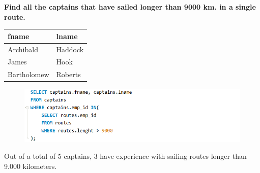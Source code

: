 \documentclass[a4paper]{article}
\begin{document}
\begin{flushleft}
    \textbf{Find all the captains that have sailed longer than 9000 km. in a single route.}
    \begin{table}[!ht]
    \flushleft
    \begin{tabular}{|l|l|}
    \hline
        fname & lname \\ \hline
        Archibald & Haddock \\ \hline
        James & Hook \\ \hline
        Bartholomew & Roberts \\ \hline
    \end{tabular}
    \end{table}
    \begin{figure} [H]
        \flushleft
        \includegraphics[width=1\linewidth]{code/SQLcaptainsLenght.PNG}
        \label{fig:SQLcaptainsLenght}
    \end{figure}
    Out of a total of 5 captains, 3 have experience with sailing routes longer than 9.000 kilometers.
\end{flushleft}
\newpage
\end{document}
